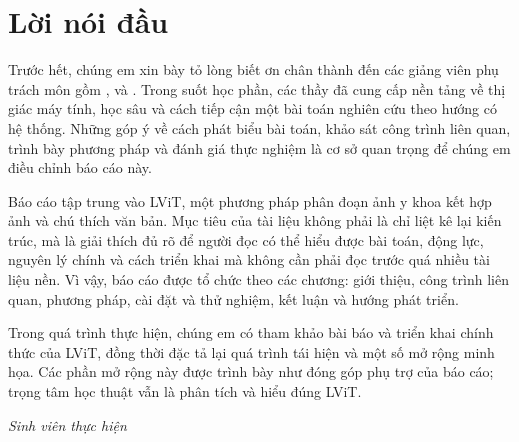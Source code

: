 \chapter*{Lời nói đầu}

Trước hết, chúng em xin bày tỏ lòng biết ơn chân thành đến các giảng viên phụ trách môn \coursename{} gồm \advisorone, \advisortwo{} và \advisorthree. Trong suốt học phần, các thầy đã cung cấp nền tảng về thị giác máy tính, học sâu và cách tiếp cận một bài toán nghiên cứu theo hướng có hệ thống. Những góp ý về cách phát biểu bài toán, khảo sát công trình liên quan, trình bày phương pháp và đánh giá thực nghiệm là cơ sở quan trọng để chúng em điều chỉnh báo cáo này.

Báo cáo tập trung vào LViT, một phương pháp phân đoạn ảnh y khoa kết hợp ảnh và chú thích văn bản. Mục tiêu của tài liệu không phải là chỉ liệt kê lại kiến trúc, mà là giải thích đủ rõ để người đọc có thể hiểu được bài toán, động lực, nguyên lý chính và cách triển khai mà không cần phải đọc trước quá nhiều tài liệu nền. Vì vậy, báo cáo được tổ chức theo các chương: giới thiệu, công trình liên quan, phương pháp, cài đặt và thử nghiệm, kết luận và hướng phát triển.

Trong quá trình thực hiện, chúng em có tham khảo bài báo và triển khai chính thức của LViT, đồng thời đặc tả lại quá trình tái hiện và một số mở rộng minh họa. Các phần mở rộng này được trình bày như đóng góp phụ trợ của báo cáo; trọng tâm học thuật vẫn là phân tích và hiểu đúng LViT.

\vspace{1cm}

\begin{flushright}
\textit{Sinh viên thực hiện}\\
\textit{\studentone}\\
\textit{\studenttwo}
\end{flushright}

\clearpage
